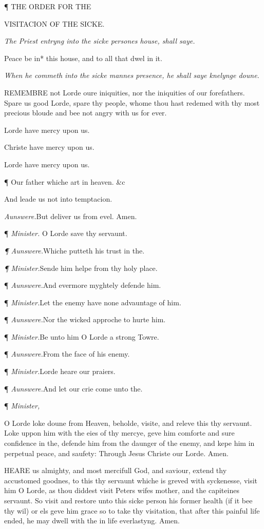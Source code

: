 ¶
THE ORDER FOR THE

VISITACION
OF THE SICKE.

\emph{The Priest entryng into the sicke persones house, shall saye.}

Peace be in* this house, and to all that dwel in it.

\emph{When
he commeth into the sicke mannes presence, he shall saye knelynge doune.}

REMEMBRE
not Lorde oure iniquities, nor the iniquities of our forefathers. Spare
us good Lorde, spare thy people, whome thou hast redemed with thy most
precious bloude and bee not angry with us for ever.

Lorde have mercy upon us.

Christe have mercy upon us.

Lorde have mercy upon us.

¶ Our father whiche art in heaven. \&c

And leade us not into temptacion.

\emph{Aunswere.}But deliver us
from evel. Amen.

¶ \emph{Minister.} O Lorde save
thy servaunt.

\emph{¶ Aunswere.}Whiche putteth
his trust in the.

\emph{¶ Minister.}Sende him helpe
from thy holy place.

¶ \emph{Aunswere}\emph{.}And
evermore myghtely defende him.

¶ \emph{Minister}\emph{.}Let
the enemy have none advauntage of him.

¶ \emph{Aunswere}\emph{.}Nor
the wicked approche to hurte him.

¶ \emph{Minister}\emph{.}Be unto
him O Lorde a strong Towre.

¶ \emph{Aunswere}\emph{.}From
the face of his enemy.

¶ \emph{Minister}\emph{.}Lorde
heare our praiers.

¶ \emph{Aunswere}\emph{.}And
let our crie come unto the.

¶
\emph{Minister,}

O Lorde loke doune from Heaven, beholde, visite, and releve this thy servaunt.
Loke uppon him with the eies of thy mercye, geve him comforte and sure
confidence in the, defende him from the daunger of the enemy, and kepe
him in perpetual peace, and saufety: Through Jesus Christe our Lorde.
Amen.

HEARE
us almighty, and most mercifull God, and saviour, extend thy accustomed
goodnes, to this thy servaunt whiche is greved with syckenesse, visit
him O Lorde, as thou diddest visit Peters wifes mother, and the capiteines
servaunt. So visit and restore unto this sicke person his former health
(if it bee thy wil) or els geve him grace so to take thy visitation, that
after this painful life ended, he may dwell with the in life everlastyng.
Amen.

